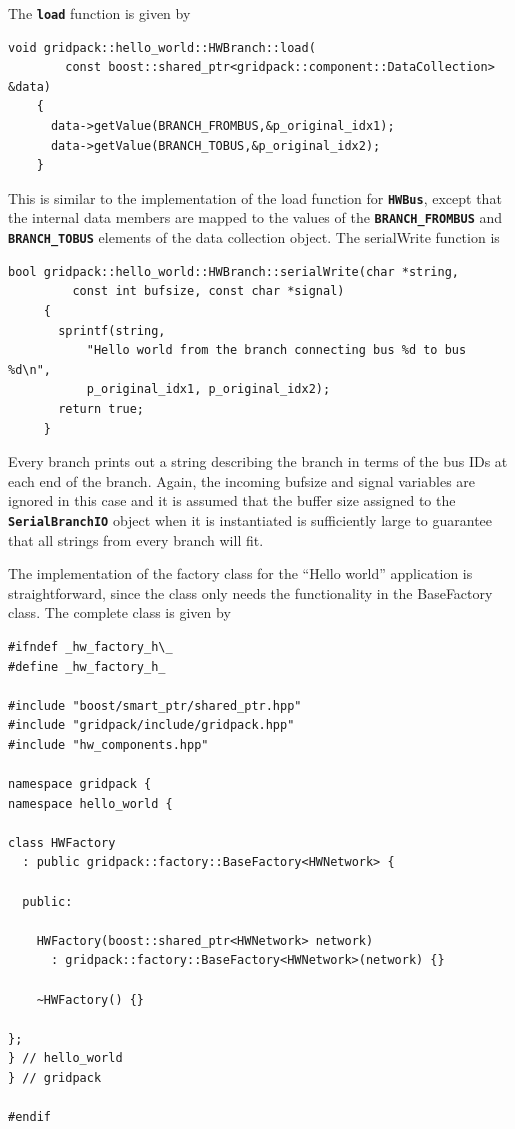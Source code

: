 \documentclass[12pt]{report} %
\begin{document}
The \texttt{\textbf{load}} function is given by

{
\color{red}
\begin{Verbatim}[fontseries=b]
    void gridpack::hello_world::HWBranch::load(
        const boost::shared_ptr<gridpack::component::DataCollection> &data)
    {
      data->getValue(BRANCH_FROMBUS,&p_original_idx1);
      data->getValue(BRANCH_TOBUS,&p_original_idx2);
    }
\end{Verbatim}
}

This is similar to the implementation of the load function for \texttt{\textbf{HWBus}}, except that the internal data members are mapped to the values of the \texttt{\textbf{BRANCH\_FROMBUS}} and \texttt{\textbf{BRANCH\_TOBUS}} elements of the data collection object. The serialWrite function is

{
\color{red}
\begin{Verbatim}[fontseries=b]
     bool gridpack::hello_world::HWBranch::serialWrite(char *string,
         const int bufsize, const char *signal)
     {
       sprintf(string,
           "Hello world from the branch connecting bus %d to bus %d\n",
           p_original_idx1, p_original_idx2);
       return true;
     }
\end{Verbatim}
}

Every branch prints out a string describing the branch in terms of the bus IDs at each end of the branch. Again, the incoming bufsize and signal variables are ignored in this case and it is assumed that the buffer size assigned to the \texttt{\textbf{SerialBranchIO}} object when it is instantiated is sufficiently large to guarantee that all strings from every branch will fit. 

The implementation of the factory class for the ``Hello world'' application is straightforward, since the class only needs the functionality in the BaseFactory class. The complete class is given by

{
\color{red}
\begin{Verbatim}[fontseries=b]
#ifndef _hw_factory_h\_
#define _hw_factory_h_

#include "boost/smart_ptr/shared_ptr.hpp"
#include "gridpack/include/gridpack.hpp"
#include "hw_components.hpp"

namespace gridpack {
namespace hello_world {

class HWFactory
  : public gridpack::factory::BaseFactory<HWNetwork> {

  public:

    HWFactory(boost::shared_ptr<HWNetwork> network)
      : gridpack::factory::BaseFactory<HWNetwork>(network) {}

    ~HWFactory() {}

};
} // hello_world
} // gridpack

#endif
\end{Verbatim}
}
\end{document}

